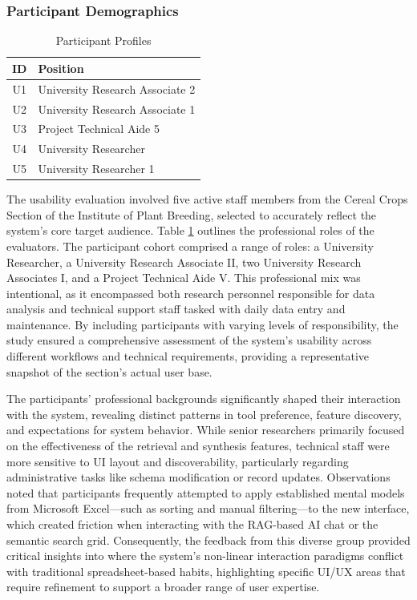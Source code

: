 \documentclass[journal]{./IEEE/IEEEtran}
\begin{document}
\subsubsection{Participant Demographics}

\begin{table}[htbp]
\caption{Participant Profiles}
\label{tab:participants}
\centering
\begin{tabular}{c|l}
\hline
\textbf{ID} & \textbf{Position} \\ \hline
U1 & University Research Associate 2 \\
U2 & University Research Associate 1 \\
U3 & Project Technical Aide 5 \\
U4 & University Researcher \\
U5 & University Researcher 1 \\ \hline
\end{tabular}
\end{table}

The usability evaluation involved five active staff members from the Cereal Crops Section of the Institute of Plant Breeding, selected to accurately reflect the system's core target audience. Table \ref{tab:participants} outlines the professional roles of the evaluators. The participant cohort comprised a range of roles: a University Researcher, a University Research Associate II, two University Research Associates I, and a Project Technical Aide V. This professional mix was intentional, as it encompassed both research personnel responsible for data analysis and technical support staff tasked with daily data entry and maintenance. By including participants with varying levels of responsibility, the study ensured a comprehensive assessment of the system’s usability across different workflows and technical requirements, providing a representative snapshot of the section's actual user base.

The participants' professional backgrounds significantly shaped their interaction with the system, revealing distinct patterns in tool preference, feature discovery, and expectations for system behavior. While senior researchers primarily focused on the effectiveness of the retrieval and synthesis features, technical staff were more sensitive to UI layout and discoverability, particularly regarding administrative tasks like schema modification or record updates. Observations noted that participants frequently attempted to apply established mental models from Microsoft Excel—such as sorting and manual filtering—to the new interface, which created friction when interacting with the RAG-based AI chat or the semantic search grid. Consequently, the feedback from this diverse group provided critical insights into where the system's non-linear interaction paradigms conflict with traditional spreadsheet-based habits, highlighting specific UI/UX areas that require refinement to support a broader range of user expertise.
\end{document}
